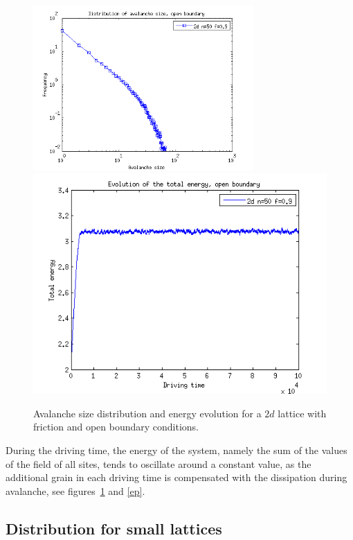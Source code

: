 \begin{figure}
\begin{center}
\includegraphics[width=0.75\textwidth]{results/2sof.png}
\includegraphics[width=1\textwidth]{results/2eof.png}
\caption{Avalanche size distribution and energy evolution for a $2d$ lattice with friction and open boundary conditions.}
\label{so}
\end{center}
\end{figure} 


During the driving time, the energy of the system, namely the sum of the values of the field of all sites,
tends to oscillate around a constant value, as the additional grain in each driving time is compensated with the dissipation during avalanche,
see figures~\ref{so} and \ref{ep}.





\subsection{Distribution for small lattices}


